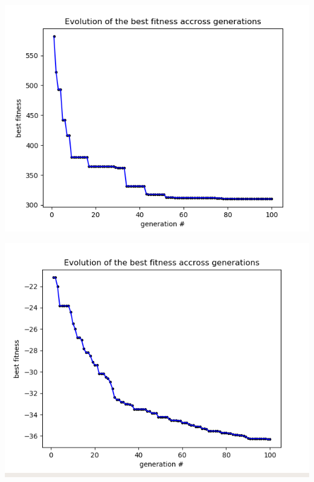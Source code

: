 \documentclass[12pt]{article}
\begin{document}
				\begin{minipage}{0.6\linewidth}
					\includegraphics[width=\linewidth]{5.png}
				\end{minipage}
				\hfill
				\begin{minipage}{0.6\linewidth}
					\includegraphics[width=\linewidth]{6.png}
				\end{minipage}
\end{document}
